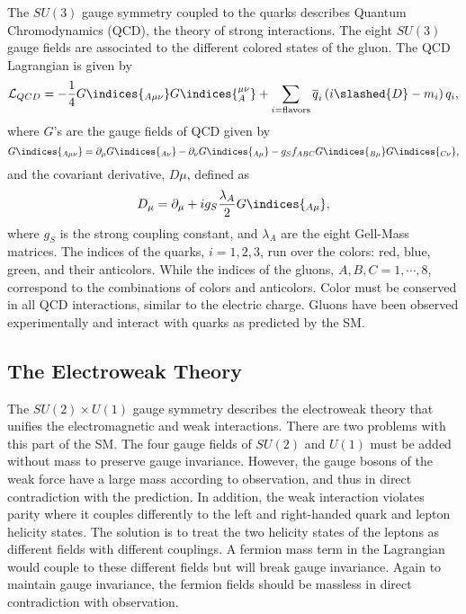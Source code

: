 The $ SU\left(3\right) $ gauge symmetry coupled to the quarks describes Quantum Chromodynamics (QCD), the theory of strong interactions.
The eight $ SU\left(3\right) $ gauge fields are associated to the different colored states of the gluon.
The QCD Lagrangian is given by
\begin{equation}
\mathcal{L}_{QCD} = -\frac{1}{4} G\indices{_{A\mu\nu}}G\indices{_{A}^{\mu\nu}} + \sum_{i=\text{flavors}} \overline{q}_i \left(i\slashed{D} - m_i\right) q_i,
\end{equation}
where $G$'s are the gauge fields of QCD given by 
\begin{equation}
G\indices{_{A\mu\nu}} = \partial_{\mu} G\indices{_{A\nu}} - \partial_{\nu} G\indices{_{A\mu}} - g_S f_{ABC} G\indices{_{B\mu}} G\indices{_{C\nu}},
\end{equation}
and the covariant derivative, $D\mu$,  defined as
\begin{equation}
D_\mu = \partial_{\mu} + i g_S \frac{\lambda_A}{2}G\indices{_{A\mu}},
\end{equation}
where $g_S$ is the strong coupling constant, and $\lambda_A$ are the eight Gell-Mass matrices.
The indices of the quarks, $i=1,2,3$, run over the colors: red, blue, green, and their anticolors.
While the indices of the gluons, $A,B,C = 1, \cdots, 8$, correspond to the combinations of colors and anticolors.
Color must be conserved in all QCD interactions, similar to the  electric charge.
Gluons have been observed experimentally  and interact with quarks as predicted by the SM.

\subsection{The Electroweak Theory}

The $ SU\left(2\right) \times U\left(1\right) $ gauge symmetry describes the
electroweak theory that unifies the electromagnetic and weak interactions.
There are two problems with this part of the SM.
The four gauge fields of $ SU\left(2\right) $ and $ U\left(1\right) $ 
must be added without mass to preserve gauge invariance.
However, the gauge bosons of the weak force have a large mass according to observation,
and thus in direct contradiction with the prediction.
In addition, the weak interaction violates parity where it couples differently 
to the left and right-handed quark and lepton helicity states.
The solution is to treat the two helicity states of the leptons as different fields
with different couplings. A fermion mass term in the Lagrangian would couple to 
these different fields but will break gauge invariance.
Again to maintain gauge invariance, the fermion fields should be massless in 
direct contradiction with observation.

